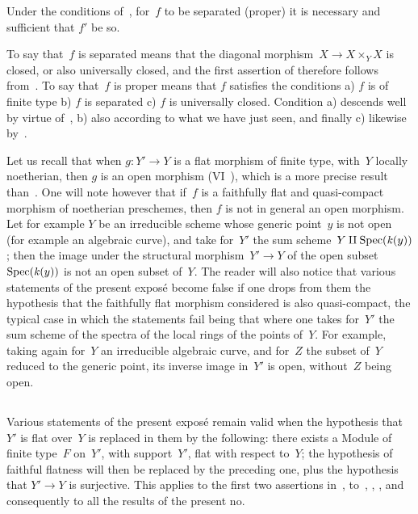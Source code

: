\begin{corollary}
\label{VIII.4.8}
Under the conditions of~, for~$f$ to be separated
(\resp proper) it is necessary and sufficient that $f'$ be so.
\end{corollary}

To say that~$f$ is separated means that the diagonal
morphism~$X\to X\times_{Y}X$ is closed, or also universally closed,
and the first assertion
of
 therefore follows from~. To say
that~$f$ is proper means that $f$ satisfies the conditions a) $f$ is
of finite type b) $f$ is separated c) $f$ is universally closed.
Condition a) descends well by virtue of~, b) also
according to what we have just seen, and finally c) likewise
by~.

\begin{remarks}
\label{VIII.4.9}
Let us recall that when $g\colon Y'\to Y$ is a flat morphism of
finite type, with~$Y$ locally noetherian, then $g$ is an open
morphism (VI~), which is a more precise result
than~. One will note however that if~$f$ is a
faithfully flat and quasi-compact morphism of noetherian preschemes,
then $f$ is not in general an open morphism. Let for example $Y$ be
an irreducible scheme whose generic point~$y$ is not open (for
example an algebraic curve), and take for~$Y'$ the sum
scheme~$Y\amalg \operatorname{Spec}(\mathit{k}(y))$; then the image under the
structural morphism~$Y'\to Y$ of the open subset~$\operatorname{Spec}(\mathit{k}(y))$
is not an open subset of~$Y$. The reader will also notice that
various statements of the present expos\'e become false if one drops
from them the hypothesis that the faithfully flat morphism
considered is also quasi-compact, the typical case in which the
statements fail being that where one takes for~$Y'$ the sum scheme
of the spectra of the local rings of the points of~$Y$. For example,
taking again for~$Y$ an irreducible algebraic curve, and for~$Z$ the
subset of~$Y$ reduced to the generic point, its inverse image
in~$Y'$ is open, without~$Z$ being open.
\end{remarks}

\subsection{}
\label{VIII.4.10}
Various
statements of the present expos\'e remain valid when the hypothesis
that~$Y'$ is flat over~$Y$ is replaced in them by the following:
there exists a Module of finite type~$F$ on~$Y'$, with support~$Y'$,
flat with respect to~$Y$; the hypothesis of faithful flatness will
then be replaced by the preceding one, plus the hypothesis that
$Y'\to Y$ is surjective. This applies to the first two assertions
in~, to~, ,
, and consequently to all the results of the
present no.

